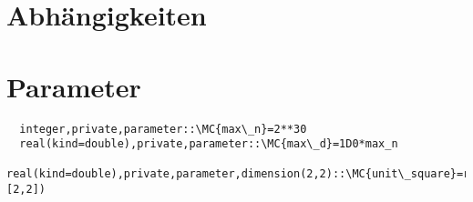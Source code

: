 \section{Abhängigkeiten}
\section{Parameter}
\begin{Verbatim}
  integer,private,parameter::\MC{max\_n}=2**30
  real(kind=double),private,parameter::\MC{max\_d}=1D0*max_n
  real(kind=double),private,parameter,dimension(2,2)::\MC{unit\_square}=reshape([0D0,0D0,1D0,1D0],[2,2])
\end{Verbatim}
